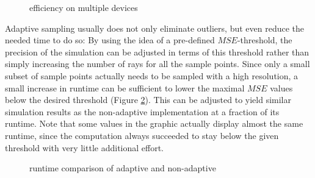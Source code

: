 \begin{figure}[H]
  \centerline{
    }
  \caption{efficiency on multiple devices}
  \label{plot:gpu_scaling}
\end{figure}
Adaptive sampling usually does not only eliminate outliers, but even reduce the
needed time to do so: By using the idea of a pre-defined $MSE$-threshold, the
precision of the simulation can be adjusted in terms of this threshold rather than
simply increasing the number of rays for all the sample points. Since only a
small subset of sample points actually needs to be sampled with a high
resolution, a small increase in runtime can be sufficient to lower the maximal
$MSE$ values below the desired threshold (Figure \ref{plot:adaptive_runtime}).
This can be adjusted to yield similar simulation results as the non-adaptive
implementation at a fraction of its runtime. Note that some values in the
graphic actually display almost the same runtime, since the computation always
succeeded to stay below the given threshold with very little additional effort.
\begin{figure}[H]
  \centerline{
    }
  \caption{runtime comparison of adaptive and non-adaptive }
  \label{plot:adaptive_runtime}
\end{figure}
